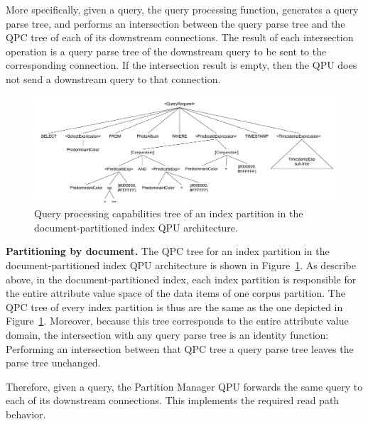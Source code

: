 More specifically, given a query,
the query processing function, generates a query parse tree,
and performs an intersection between the query parse tree and the QPC tree of each of its downstream connections.
The result of each intersection operation is a query parse tree of the downstream query to be sent to the corresponding
connection.
If the intersection result is empty, then the QPU does not send a downstream query to that connection.

\begin{figure}
  \centering
    \includegraphics[width=\textwidth]{./figures/case_studies/qpt_index_partitioning_docs.pdf}
  \caption{Query processing capabilities tree of an index partition in the document-partitioned index QPU architecture.}
  \label{fig:qpt_index_partitioning_docs}
\end{figure}

\medskip
\noindent
\textbf{Partitioning by document.}
The QPC tree for an index partition in the document-partitioned index QPU architecture is shown in Figure~\ref{fig:qpt_index_partitioning_docs}.
As describe above, in the document-partitioned index, each index partition is responsible for the entire attribute value space of
the data items of one corpus partition.
The QPC tree of every index partition is thus are the same as the one depicted in Figure~\ref{fig:qpt_index_partitioning_docs}.
Moreover, because this tree corresponds to the entire attribute value domain,
the intersection with any query parse tree is an identity function:
Performing an intersection between that QPC tree a query parse tree leaves the parse tree unchanged.

Therefore,
given a query,
the Partition Manager QPU forwards the same query to each of its downstream connections.
This implements the required read path behavior.


